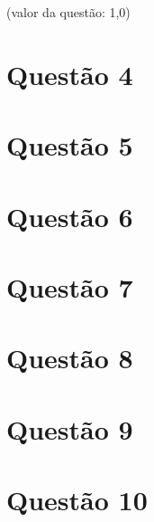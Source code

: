 \documentclass[10pt,a4paper]{article}
\begin{document}
	(valor da questão: 1,0)
	
	\section{Questão 4}
	
	\section{Questão 5}
	
	\section{Questão 6}
	
	\section{Questão 7}
	
	\section{Questão 8}
	
	\section{Questão 9}
	
	\section{Questão 10}
\end{document}
